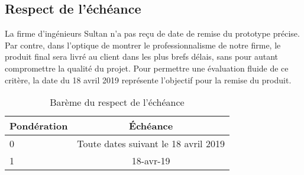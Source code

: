 

\subsection{Respect de l’échéance}
\label{s:cdc_cee_rspech}

La firme d’ingénieurs Sultan n’a pas reçu de date de remise du prototype précise.
Par contre, dans l’optique de montrer le professionnalisme de notre firme, le produit final sera livré au client dans les plus brefs délais, sans pour autant compromettre la qualité du projet.
Pour permettre une évaluation fluide de ce critère, la date du 18 avril 2019 représente l’objectif pour la remise du produit.

\begin{table}[htp]
	\caption{Barème du respect de l’échéance}
	\label{tab:cdc_cee_rspech}
	\centering
	\begin{tabular}{|l|c|}
		\hline
		Pondération & Échéance \\\hline
		0 & Toute dates suivant le 18 avril 2019 \\\hline
		1 & 18-avr-19 \\\hline
	\end{tabular}
\end{table}